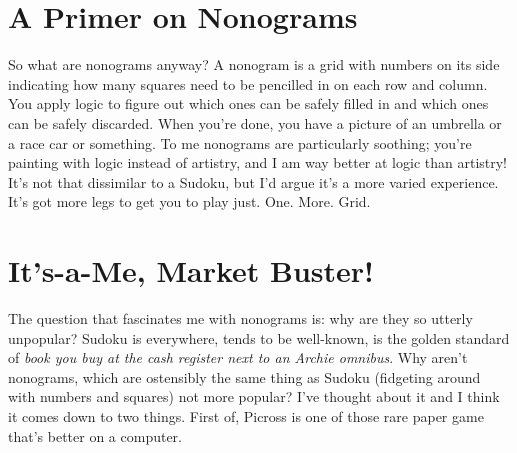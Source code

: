 \documentclass{book}
\begin{document}
\FloatBarrier\needspace{5pt}\section*{A Primer on Nonograms}\nopagebreak[4]

So what are nonograms anyway? A nonogram is a grid with numbers on its side indicating how many squares need to be pencilled in on each row and column. You apply logic to figure out which ones can be safely filled in and which ones can be safely discarded. When you’re done, you have a picture of an umbrella or a race car or something. To me nonograms are particularly soothing; you’re painting with logic instead of artistry, and I am way better at logic than artistry! It’s not that dissimilar to a Sudoku, but I’d argue it’s a more varied experience. It’s got more legs to get you to play just. One. More. Grid.

\FloatBarrier\needspace{5pt}\section*{It’s-a-Me, Market Buster!}\nopagebreak[4]

The question that fascinates me with nonograms is: why are they so utterly unpopular? Sudoku is everywhere, tends to be well-known, is the golden standard of \emph{book you buy at the cash register next to an Archie omnibus}. Why aren’t nonograms, which are ostensibly the same thing as Sudoku (fidgeting around with numbers and squares) not more popular? I’ve thought about it and I think it comes down to two things. First of, Picross is one of those rare paper game that’s better on a computer.
\end{document}
